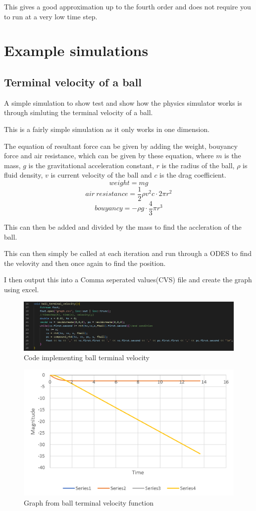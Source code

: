 \documentclass[12pt, a2paper]{article}
\begin{document}
This gives a good approximation up to the fourth order and does not require you to run at a very low time step.

\section{Example simulations}
\subsection{Terminal velocity of a ball}
A simple simulation to show test and show how the physics simulator works is through simluting the terminal velocity of a ball.

This is a fairly simple simulation as it only works in one dimension.

The equation of resultant force can be given by adding the weight, bouyancy force and air resistance, which can be given by these equation, where \(m\) is the mass, \(g\) is the gravitational acceleration constant, \(r\) is the radius of the ball, \(\rho\) is fluid density, \(v\) is current velocity of the ball and \(c\) is the drag coefficient.
\[weight = mg\]
\[air\:resistance = \frac{1}{2}\rho v^2 c\cdot 2\pi r^2\]
\[bouyancy = -\rho g \cdot\frac{4}{3}\pi r^3\]

This can then be added and divided by the mass to find the accleration of the ball.

This can then simply be called at each iteration and run through a ODES to find the velovity and then once again to find the position.

I then output this into a Comma seperated values(CVS) file and create the graph using excel.
\begin{figure}[h]
\centering
\includegraphics[width=1\textwidth]{ball terminal velocity function}
\caption{Code implementing ball terminal velocity}
\label{fig 1}
\end{figure}
\begin{figure}[h]
\centering
\includegraphics[width=1\textwidth]{ball terminal velocity graph}
\caption{Graph from ball terminal velocity function}
\label{Graph 1}
\end{figure}
\end{document}
